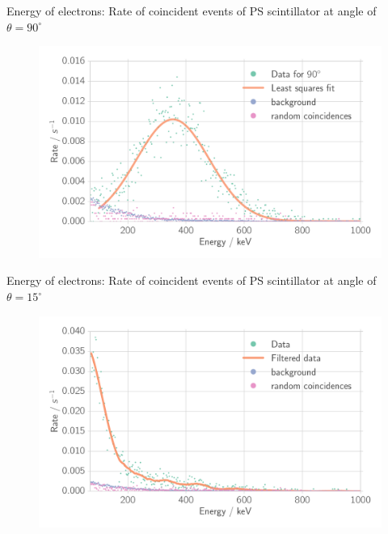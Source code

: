 \documentclass[xcolor=x11names,compress]{beamer}
\renewcommand{\(}{\begin{columns}}
\renewcommand{\)}{\end{columns}}
\newcommand{\<}[1]{\begin{column}{#1}}
\renewcommand{\>}{\end{column}}
\begin{document}
\begin{frame}[t]{Energy of electrons: Rate of coincident events of PS scintillator at angle of $\theta = 90^\circ$}

    \begin{figure}[htpb]
    \centering
    \includegraphics[width=1.0\linewidth]{../analysis/figures/coin_ps_90}
\label{fig:coin_ps_90}
\end{figure}

\end{frame}
\begin{frame}[t]{Energy of electrons: Rate of coincident events of PS scintillator at angle of $\theta = 15^\circ$}
    \begin{figure}[htpb]
    \centering
    \includegraphics[width=1.0\linewidth]{../analysis/figures/coin_ps_15_filter_}
\label{fig:coin_ps_15}
\end{figure}
\end{frame}
\end{document}
